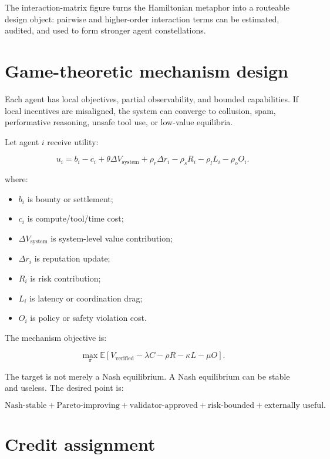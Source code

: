 The interaction-matrix figure turns the Hamiltonian metaphor into a
routeable design object: pairwise and higher-order interaction terms can
be estimated, audited, and used to form stronger agent constellations.

\section{Game-theoretic mechanism
design}\label{game-theoretic-mechanism-design}

Each agent has local objectives, partial observability, and bounded
capabilities. If local incentives are misaligned, the system can
converge to collusion, spam, performative reasoning, unsafe tool use, or
low-value equilibria.

Let agent \(i\) receive utility:

\[
u_i=b_i-c_i+\theta\Delta V_{\text{system}}+\rho_r\Delta r_i-\rho_sR_i-\rho_lL_i-\rho_oO_i.
\]

where:

\begin{itemize}
\tightlist
\item
  \(b_i\) is bounty or settlement;
\item
  \(c_i\) is compute/tool/time cost;
\item
  \(\Delta V_{\text{system}}\) is system-level value contribution;
\item
  \(\Delta r_i\) is reputation update;
\item
  \(R_i\) is risk contribution;
\item
  \(L_i\) is latency or coordination drag;
\item
  \(O_i\) is policy or safety violation cost.
\end{itemize}

The mechanism objective is:

\[
\max_{\pi}\mathbb{E}[V_{\text{verified}}-\lambda C-\rho R-\kappa L-\mu O].
\]

The target is not merely a Nash equilibrium. A Nash equilibrium can be
stable and useless. The desired point is:

\[
\text{Nash-stable}+
\text{Pareto-improving}+
\text{validator-approved}+
\text{risk-bounded}+
\text{externally useful}.
\]

\section{Credit assignment}\label{credit-assignment}

